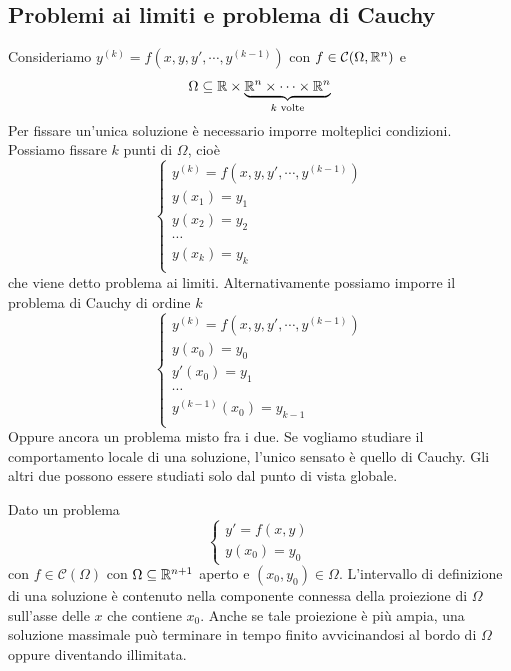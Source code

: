 \documentclass[a4paper]{article}
\begin{document}
\subsection{Problemi ai limiti e problema di Cauchy}

\begin{radioactive}
Consideriamo \(y^{(k)} = f(x,y,y', \cdots, y^{(k-1)})\)
con \(f \in \mathcal C(\Omega, \mathbb{R}^n)\)
e \[
    \Omega \subseteq \mathbb{R} \times
    \underbrace{\mathbb{R}^n \times \cdots \times \mathbb{R}^n}_{k \text{ volte}}
\]
Per fissare un'unica soluzione è necessario imporre molteplici condizioni.
Possiamo fissare \(k\) punti di \(\Omega\), cioè
\[
    \begin{cases}
        y^{(k)} = f(x,y,y', \cdots, y^{(k-1)}) \\
        y(x_1) = y_1 \\
        y(x_2) = y_2 \\
        \cdots \\
        y(x_k) = y_k \\
    \end{cases}
\]
che viene detto problema ai limiti.
Alternativamente possiamo imporre il problema di Cauchy di ordine \(k\)
\[
    \begin{cases}
        y^{(k)} = f(x,y,y', \cdots, y^{(k-1)}) \\
        y(x_0) = y_0 \\
        y'(x_0) = y_1 \\
        \cdots \\
        y^{(k-1)}(x_0) = y_{k-1} \\
    \end{cases}
\]
Oppure ancora un problema misto fra i due.
Se vogliamo studiare il comportamento locale di una soluzione,
l'unico sensato è quello di Cauchy.
Gli altri due possono essere studiati solo dal punto di vista globale.
\end{radioactive}

\begin{radioactive}
Dato un problema
\[
    \begin{cases}
        y' = f(x,y) \\
        y(x_0) = y_0
    \end{cases}
\]
con \(f \in \mathcal C(\Omega)\) con \(\Omega \subseteq \mathbb{R}^{n+1}\) aperto e
\((x_0, y_0) \in \Omega\).
L'intervallo di definizione di una soluzione è contenuto nella componente connessa della proiezione di \(\Omega\) sull'asse delle \(x\) che contiene \(x_0\). Anche se tale proiezione è più ampia, una soluzione massimale può terminare in tempo finito avvicinandosi al bordo di \(\Omega\) oppure diventando illimitata.
\end{radioactive}
\end{document}
